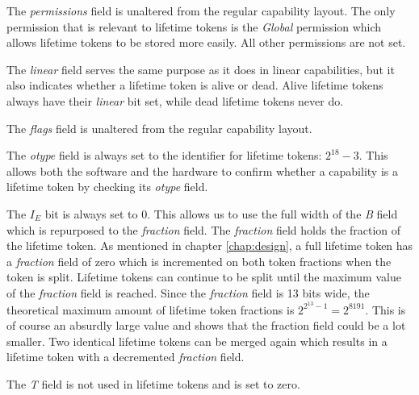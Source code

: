 The \textit{permissions} field is unaltered from the regular capability layout. The only permission that is relevant to lifetime tokens is the \textit{Global} permission which allows lifetime tokens to be stored more easily. All other permissions are not set.

The \textit{linear} field serves the same purpose as it does in linear capabilities, but it also indicates whether a lifetime token is alive or dead. Alive lifetime tokens always have their \textit{linear} bit set, while dead lifetime tokens never do.

The \textit{flags} field is unaltered from the regular capability layout.

The \textit{otype} field is always set to the identifier for lifetime tokens: $2^{18} - 3$. This allows both the software and the hardware to confirm whether a capability is a lifetime token by checking its \textit{otype} field.

The $I_E$ bit is always set to 0. This allows us to use the full width of the \textit{B} field which is repurposed to the \textit{fraction} field. The \textit{fraction} field holds the fraction of the lifetime token. As mentioned in chapter \ref{chap:design}, a full lifetime token has a \textit{fraction} field of zero which is incremented on both token fractions when the token is split. Lifetime tokens can continue to be split until the maximum value of the \textit{fraction} field is reached. Since the \textit{fraction} field is 13 bits wide, the theoretical maximum amount of lifetime token fractions is $2^{2^{13} - 1}=2^{8191}$.
This is of course an absurdly large value and shows that the fraction field could be a lot smaller.
Two identical lifetime tokens can be merged again which results in a lifetime token with a decremented \textit{fraction} field.

The \textit{T} field is not used in lifetime tokens and is set to zero.

